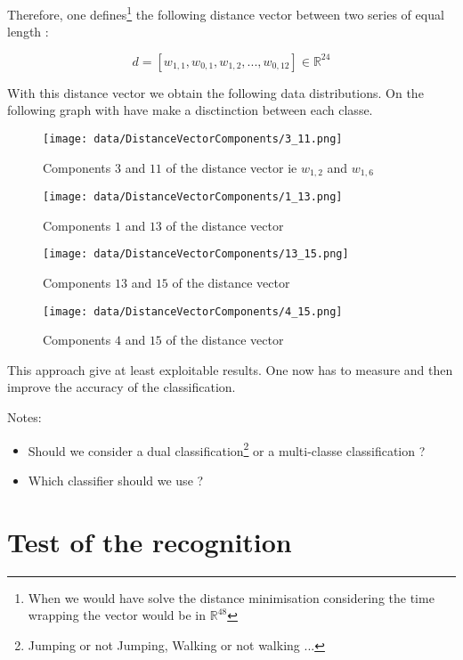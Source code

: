 \documentclass[a4,12pt]{article}
\newcommand{\R}{\mathbb{R}}
\begin{document}
	Therefore, one defines\footnote{When we would have solve the distance minimisation considering the time wrapping the vector would be in $\R^{48}$} the following distance vector between two series of equal length :
	
	\[ d=[w_{1,1}, w_{0,1}, w_{1,2}, ..., w_{0,12}] \in \R^{24} \]
	
	With this distance vector we obtain the following data distributions. On the following graph with have make a disctinction between each classe.
	
	\begin{figure}[H]
		\centering
		\texttt{[image: data/DistanceVectorComponents/3\_11.png]}
		\caption{Components $3$ and $11$ of the distance vector ie $w_{1,2}$ and $w_{1,6}$}
		\label{dist_components}
	\end{figure}
	
	\begin{figure}[H]
		\centering
		\texttt{[image: data/DistanceVectorComponents/1\_13.png]}
		\caption{Components $1$ and $13$ of the distance vector}
		\label{dist_components}
	\end{figure}
	
	\begin{figure}[H]
		\centering
		\texttt{[image: data/DistanceVectorComponents/13\_15.png]}
		\caption{Components $13$ and $15$ of the distance vector}
		\label{dist_components}
	\end{figure}
	
	\begin{figure}[H]
		\centering
		\texttt{[image: data/DistanceVectorComponents/4\_15.png]}
		\caption{Components $4$ and $15$ of the distance vector}
		\label{dist_components}
	\end{figure}
	
	This approach give at least exploitable results. One now has to measure and then improve the accuracy of the classification.
	
	Notes:
	\begin{itemize}
		\item Should we consider a dual classification\footnote{Jumping or not Jumping, Walking or not walking ...} or a multi-classe classification ?
		\item Which classifier should we use ?
	\end{itemize}
	
	\section{Test of the recognition}
	
\end{document}
